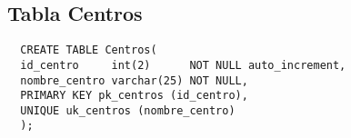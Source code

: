 \subsection{Tabla Centros}

\begin{verbatim}
  CREATE TABLE Centros(
  id_centro     int(2)      NOT NULL auto_increment,
  nombre_centro varchar(25) NOT NULL,
  PRIMARY KEY pk_centros (id_centro),
  UNIQUE uk_centros (nombre_centro)
  );
\end{verbatim}